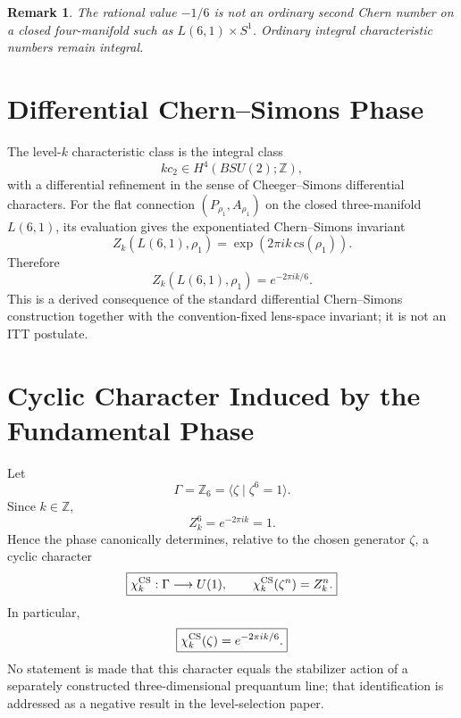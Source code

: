 \documentclass[11pt,a4paper]{article}
\newtheorem{remark}[definition]{Remark}
\begin{document}
\begin{remark}
The rational value $-1/6$ is not an ordinary second Chern number on a closed four-manifold such as $L(6,1)\times S^1$. Ordinary integral characteristic numbers remain integral.
\end{remark}

\section{Differential Chern--Simons Phase}

The level-$k$ characteristic class is the integral class
\begin{equation}
kc_2\in H^4(BSU(2);\mathbb Z),
\end{equation}
with a differential refinement in the sense of Cheeger--Simons differential characters\cite{CheegerSimons1985,Freed1995}.
For the flat connection $(P_{\rho_1},A_{\rho_1})$ on the closed three-manifold $L(6,1)$, its evaluation gives the exponentiated Chern--Simons invariant
\begin{equation}
\boxed{
Z_k(L(6,1),\rho_1)
=
\exp\left(2\pi i k\,\mathrm{cs}(\rho_1)\right).
}
\end{equation}
Therefore
\begin{equation}
\boxed{
Z_k(L(6,1),\rho_1)=e^{-2\pi i k/6}.
}
\end{equation}
This is a derived consequence of the standard differential Chern--Simons construction together with the convention-fixed lens-space invariant; it is not an ITT postulate.

\section{Cyclic Character Induced by the Fundamental Phase}

Let
\begin{equation}
\Gamma=\mathbb Z_6=\langle\zeta\mid\zeta^6=1\rangle.
\end{equation}
Since $k\in\mathbb Z$,
\begin{equation}
Z_k^6=e^{-2\pi i k}=1.
\end{equation}
Hence the phase canonically determines, relative to the chosen generator $\zeta$, a cyclic character
\begin{equation}
\boxed{
\chi_k^{\rm CS}:\Gamma\longrightarrow U(1),
\qquad
\chi_k^{\rm CS}(\zeta^n)=Z_k^n.
}
\end{equation}
In particular,
\begin{equation}
\boxed{
\chi_k^{\rm CS}(\zeta)=e^{-2\pi i k/6}.
}
\end{equation}
No statement is made that this character equals the stabilizer action of a separately constructed three-dimensional prequantum line; that identification is addressed as a negative result in the level-selection paper.
\end{document}
